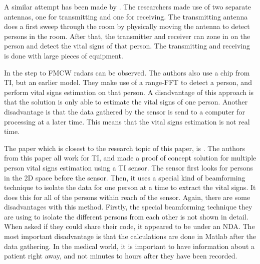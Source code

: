 A similar attempt has been made by \cite{yang2016monitoring}. The researchers made use of two separate antennas, one for transmitting and one for receiving. The transmitting antenna does a first sweep through the room by physically moving the antenna to detect persons in the room. After that, the transmitter and receiver can zone in on the person and detect the vital signs of that person. The transmitting and receiving is done with large pieces of equipment. 

In \cite{alizadeh2019remote} the step to FMCW radars can be observed. The authors also use a chip from TI, but an earlier model. They make use of a range-FFT to detect a person, and perform vital signs estimation on that person. A disadvantage of this approach is that the solution is only able to estimate the vital signs of one person. Another disadvantage is that the data gathered by the sensor is send to a computer for processing at a later time. This means that the vital signs estimation is not real time. 

The paper which is closest to the research topic of this paper, is \cite{ahmad2018vital}. The authors from this paper all work for TI, and made a proof of concept solution for multiple person vital signs estimation using a TI sensor. The sensor first looks for persons in the 2D space before the sensor. Then, it uses a special kind of beamforming technique to isolate the data for one person at a time to extract the vital signs. It does this for all of the persons within reach of the sensor. Again, there are some disadvantages with this method. Firstly, the special beamforming technique they are using to isolate the different persons from each other is not shown in detail. When asked if they could share their code, it appeared to be under an NDA. The most important disadvantage is that the calculations are done in Matlab after the data gathering. In the medical world, it is important to have information about a patient right away, and not minutes to hours after they have been recorded. 